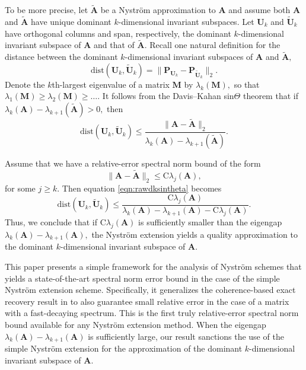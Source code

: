 \documentclass[11pt,letterpaper,twoside,reqno,nosumlimits]{amsart}
\newcommand{\mat}[1]{\ensuremath{\bm{#1}}}
\theoremstyle{remark}
\begin{document}
To be more precise, let $\tilde{\mat{A}}$ be a Nystr\"om approximation to $\mat{A}$ and assume both $\mat{A}$ and $\tilde{\mat{A}}$ have unique dominant $k$-dimensional invariant subspaces. Let $\mat{U}_k$ and $\tilde{\mat{U}}_k$ have orthogonal columns and span, respectively, the dominant $k$-dimensional invariant subspace of $\mat{A}$ and that of $\tilde{\mat{A}}.$ Recall one natural definition for the distance between the dominant $k$-dimensional invariant subspaces of $\mat{A}$ and $\tilde{\mat{A}},$  
\[
 \text{dist}(\mat{U}_k, \tilde{\mat{U}}_k) = \|\mat{P}_{\mat{U}_k} - \mat{P}_{\tilde{\mat{U}}_k}\|_2.
\]
Denote the $k$th-largest eigenvalue of a matrix $\mat{M}$ by $\lambda_k(\mat{M}),$ so that $\lambda_1(\mat{M}) \geq \lambda_2(\mat{M}) \geq \ldots.$
It follows from the Davis--Kahan sin$\Theta$ theorem that if $\lambda_k(\mat{A}) - \lambda_{k+1}(\tilde{\mat{A}}) > 0,$ then
\begin{equation}
 \text{dist}(\mat{U}_k, \tilde{\mat{U}}_k) \leq \frac{\|\mat{A} - \tilde{\mat{A}}\|_2}{\lambda_k(\mat{A}) - \lambda_{k+1}(\tilde{\mat{A}})}.
\label{eqn:rawdksintheta}
\end{equation}

Assume that we have a relative-error spectral norm bound of the form
\[
 \| \mat{A} - \tilde{\mat{A}} \|_2 \leq \mathrm{C} \lambda_j(\mat{A}),
\]
for some $j \geq k.$ Then equation \eqref{eqn:rawdksintheta} becomes
\[
 \text{dist}(\mat{U}_k, \tilde{\mat{U}}_k) \leq \frac{ \mathrm{C} \lambda_j(\mat{A}) }{\lambda_k(\mat{A}) - \lambda_{k+1}(\mat{A}) - \mathrm{C}\lambda_j(\mat{A})}.
\]
Thus, we conclude that if $\mathrm{C} \lambda_j(\mat{A})$ is sufficiently smaller than the eigengap $\lambda_k(\mat{A}) - \lambda_{k+1}(\mat{A}),$ the Nystr\"om extension yields a quality approximation to the dominant $k$-dimensional invariant subspace of $\mat{A}.$

This paper presents a simple framework for the analysis of Nystr\"om schemes that yields a state-of-the-art spectral norm error bound in the case of the simple Nystr\"om extension scheme. Specifically, it generalizes the coherence-based exact recovery result in \cite{TR10} to also guarantee small relative error in the case of a matrix with a fast-decaying spectrum. This is the first truly relative-error spectral norm bound available for any Nystr\"om extension method. When the eigengap $\lambda_k(\mat{A}) - \lambda_{k+1}(\mat{A})$ is sufficiently large, our result sanctions the use of the simple Nystr\"om extension for the approximation of the dominant $k$-dimensional invariant subspace of $\mat{A}.$
\end{document}
